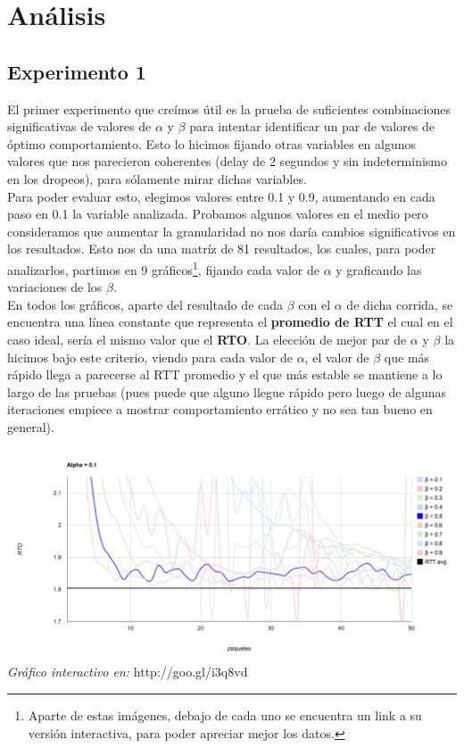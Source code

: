 \section{Análisis}

\subsection{Experimento 1}

El primer experimento que creímos útil es la prueba de suficientes combinaciones significativas de valores de $\alpha$ y $\beta$ para intentar identificar un par de valores de óptimo comportamiento. Esto lo hicimos fijando otras variables en algunos valores que nos parecieron coherentes (delay de 2 segundos y sin indeterminismo en los dropeos), para sólamente mirar dichas variables.\\

\indent Para poder evaluar esto, elegimos valores entre 0.1 y 0.9, aumentando en cada paso en 0.1 la variable analizada. Probamos algunos valores en el medio pero consideramos que aumentar la granularidad no nos daría cambios significativos en los resultados. Esto nos da una matríz de 81 resultados, los cuales, para poder analizarlos, partimos en 9 gráficos\footnote{Aparte de estas imágenes, debajo de cada uno se encuentra un link a su versión interactiva, para poder apreciar mejor los datos.}, fijando cada valor de $\alpha$ y graficando las variaciones de los $\beta$.\\

\indent En todos los gráficos, aparte del resultado de cada $\beta$ con el $\alpha$ de dicha corrida, se encuentra una línea constante que representa el \textbf{promedio de RTT} el cual en el caso ideal, sería el mismo valor que el \textbf{RTO}. La elección de mejor par de $\alpha$ y $\beta$ la hicimos bajo este criterio, viendo para cada valor de $\alpha$, el valor de $\beta$ que más rápido llega a parecerse al RTT promedio y el que más estable se mantiene a lo largo de las pruebas (pues puede que alguno llegue rápido pero luego de algunas iteraciones empiece a mostrar comportamiento errático y no sea tan bueno en general).

\begin{center}
	\includegraphics[scale=0.35]{graphics/rto_vs_paquetes_a_1.png}
	\textit{Gráfico interactivo en:} http://goo.gl/i3q8vd
\end{center}

